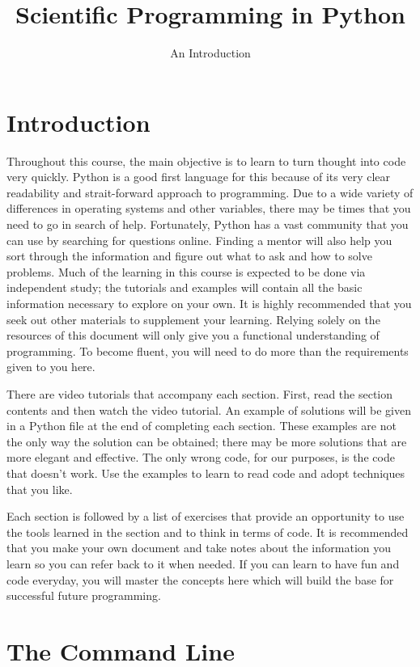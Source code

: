 \documentclass[12pt]{amsart}
\title{Scientific Programming in Python}
\author{An Introduction}
\date{}
\theoremstyle{definition}
\begin{document}
\maketitle
\tableofcontents

\section{Introduction}%

Throughout this course, the main objective is to learn to turn thought into code very quickly. Python is a good first language for this because of its very clear readability and strait-forward approach to programming. Due to a wide variety of differences in operating systems and other variables, there may be times that you need to go in search of help. Fortunately, Python has a vast community that you can use by searching for questions online. Finding a mentor will also help you sort through the information and figure out what to ask and how to solve problems. Much of the learning in this course is expected to be done via independent study; the tutorials and examples will contain all the basic information necessary to explore on your own. It is highly recommended that you seek out other materials to supplement your learning. Relying solely on the resources of this document will only give you a functional understanding of programming. To become fluent, you will need to do more than the requirements given to you here.

There are video tutorials that accompany each section. First, read the section contents and then watch the video tutorial. An example of solutions will be given in a Python file at the end of completing each section. These examples are not the only way the solution can be obtained; there may be more solutions that are more elegant and effective. The only wrong code, for our purposes, is the code that doesn't work. Use the examples to learn to read code and adopt techniques that you like.

Each section is followed by a list of exercises that provide an opportunity to use the tools learned in the section and to think in terms of code. It is recommended that you make your own document and take notes about the information you learn so you can refer back to it when needed. If you can learn to have fun and code everyday, you will master the concepts here which will build the base for successful future programming.

\section{The Command Line}%
\end{document}
